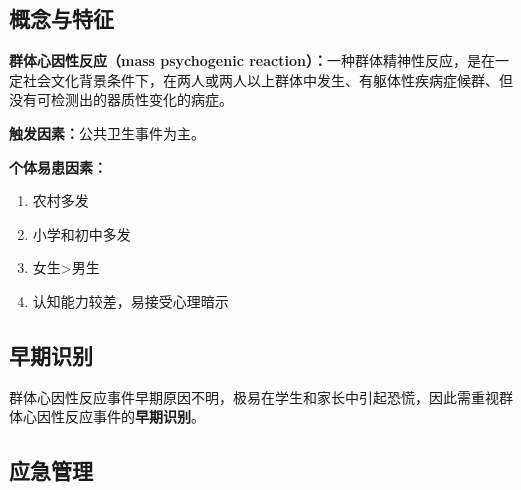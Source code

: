 \subsection{概念与特征}

\begin{defbox}
\textbf{群体心因性反应（mass psychogenic reaction）：}一种群体精神性反应，是在一定社会文化背景条件下，在两人或两人以上群体中发生、有躯体性疾病症候群、但没有可检测出的器质性变化的病症。

\textbf{触发因素：}公共卫生事件为主。

\textbf{个体易患因素：}
\begin{enumerate}[leftmargin=*]
    \item 农村多发
    \item 小学和初中多发
    \item 女生>男生
    \item 认知能力较差，易接受心理暗示
\end{enumerate}
\end{defbox}

\subsection{早期识别}

\begin{keybox}
群体心因性反应事件早期原因不明，极易在学生和家长中引起恐慌，因此需重视群体心因性反应事件的\textbf{早期识别}。
\end{keybox}

\subsection{应急管理}

